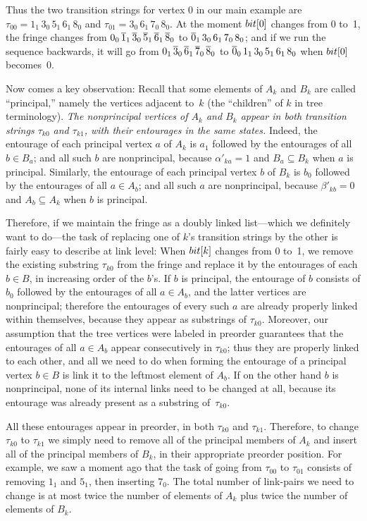 Thus the two transition strings for vertex 0 in our main example are
$\tau_{00}=1_1\,3_0\,5_1\,6_1\,8_0$ and $\tau_{01}=3_0\,6_1\,7_0\,8_0$.
At the moment $\\{bit}[0]$ changes from 0 to~1, the fringe changes from
$0_0\,\overline1_1\,\overline3_0\,\overline5_1\,\overline6_1\,\overline8_0$ to $\overline0_1\,3_0\,6_1\,7_0\,8_0$;
and if we run the sequence backwards, it will go from
$0_1\,\overline3_0\,\overline6_1\,\overline7_0\,\overline8_0$ to $\overline0_0\,1_1\,3_0\,5_1\,6_1\,8_0$
when $\\{bit}[0]$ becomes~0.

\fi

Now comes a key observation: Recall that some elements
of $A_k$ and $B_k$
are called ``principal,'' namely the vertices adjacent to~$k$ (the
``children'' of $k$ in tree terminology). {\sl The nonprincipal vertices of
$A_k$ and $B_k$ appear in both transition strings $\tau_{k0}$ and $\tau_{k1}$,
with their entourages in the same states.} Indeed, the entourage
of each principal vertex $a$ of $A_k$ is $a_1$ followed by the
entourages of all $b\in B_a$; and all such $b$ are nonprincipal,
because $\alpha'_{ka}=1$ and $B_a\subseteq B_k$ when $a$ is principal.
Similarly, the entourage
of each principal vertex $b$ of $B_k$ is $b_0$ followed by the
entourages of all $a\in A_b$; and all such $a$ are nonprincipal,
because $\beta'_{kb}=0$ and $A_b\subseteq A_k$ when $b$ is principal.

Therefore, if we maintain the fringe as a doubly linked list---which we
definitely want to do---the task of replacing one of $k$'s transition strings
by the other is fairly easy to describe at link level: When $\\{bit}[k]$ changes
from 0 to~1, we remove the existing substring $\tau_{k0}$ from the fringe
and replace it by the entourages of each $b\in B$, in increasing order
of the $b$'s. If $b$ is principal, the entourage of $b$ consists of
$b_0$ followed by the entourages of all $a\in A_b$, and the latter vertices
are nonprincipal; therefore the entourages of every such $a$ are already
properly linked within themselves, because they appear as substrings of
$\tau_{k0}$. Moreover, our assumption that the tree vertices were
labeled in preorder guarantees that the entourages of all $a\in A_b$
appear consecutively in\/ $\tau_{k0}$; thus they are properly linked
to each other, and all we need to do when forming the entourage of a
principal vertex $b\in B$ is link it to the leftmost element of $A_b$.
If on the other hand $b$ is nonprincipal, none of its internal links
need to be changed at all, because its entourage was already present
as a substring of~$\tau_{k0}$.

All these entourages appear in preorder, in both $\tau_{k0}$ and $\tau_{k1}$.
Therefore, to change $\tau_{k0}$ to $\tau_{k1}$ we simply need to
remove all of the principal members of $A_k$ and insert all of the
principal members of $B_k$, in their appropriate preorder position.
For example, we saw a moment ago that the task of
going from $\tau_{00}$ to $\tau_{01}$ consists of
removing $1_1$ and $5_1$, then inserting $7_0$.
The total number of link-pairs we need to change is at most
twice the number of elements of $A_k$ plus twice the number of
elements of $B_k$.

